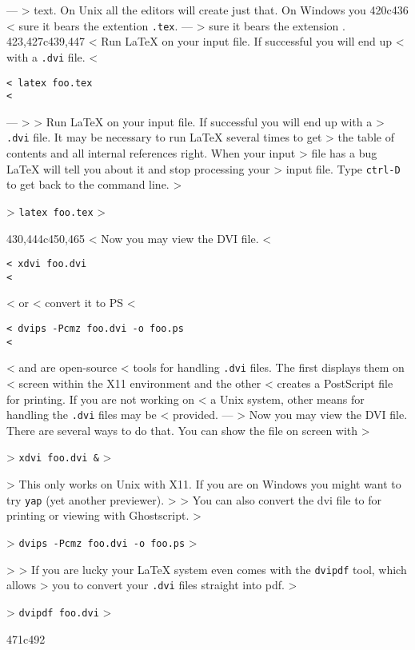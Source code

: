 ---
>   text.  On Unix all the editors will create just that. On Windows you
420c436
<   sure it bears the extention \texttt{.tex}.
---
>   sure it bears the extension .
423,427c439,447
< Run \LaTeX{} on your input file. If successful you will end up
< with a \texttt{.dvi} file.
< \begin{verbatim}
< latex foo.tex
< \end{verbatim}
---
> 
> Run \LaTeX{} on your input file. If successful you will end up with a
> \texttt{.dvi} file. It may be necessary to run \LaTeX{} several times to get
> the table of contents and all internal references right. When your input
> file has a bug \LaTeX{} will tell you about it and stop processing your
> input file. Type \texttt{ctrl-D} to get back to the command line.
> \begin{lscommand}
> \verb+latex foo.tex+
> \end{lscommand}
430,444c450,465
< Now you may view the DVI file.
< \begin{verbatim}
< xdvi foo.dvi
< \end{verbatim}
< or
< convert it to PS
< \begin{verbatim}
< dvips -Pcmz foo.dvi -o foo.ps
< \end{verbatim}
< \texttt{} and \texttt{} are open-source
< tools for handling \texttt{.dvi} files. The first displays them on
< screen within the X11 environment and the other
< creates a PostScript file for printing. If you are not working on
< a Unix system, other means for handling the \texttt{.dvi} files may be
< provided. 
---
> Now you may view the DVI file. There are several ways to do that. You can show the file on screen with
> \begin{lscommand}
> \verb+xdvi foo.dvi &+
> \end{lscommand}
> This only works on Unix with X11. If you are on Windows you might want to try \texttt{yap} (yet another previewer).
> 
> You can also convert the dvi file to \PSi{} for printing or viewing with Ghostscript.
> \begin{lscommand}
> \verb+dvips -Pcmz foo.dvi -o foo.ps+
> \end{lscommand}
> 
> If you are lucky your \LaTeX{} system even comes with the \texttt{dvipdf} tool, which allows
> you to convert your \texttt{.dvi} files straight into pdf.
> \begin{lscommand}
> \verb+dvipdf foo.dvi+
> \end{lscommand}
471c492
